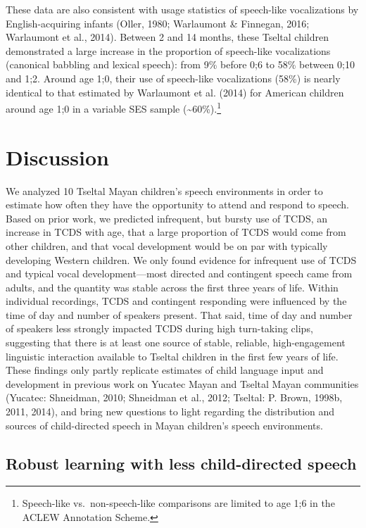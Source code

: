 \documentclass[floatsintext,man]{apa6}
\theoremstyle{definition}
\theoremstyle{definition}
\theoremstyle{definition}
\theoremstyle{remark}
\begin{document}
These data are also consistent with usage statistics of speech-like
vocalizations by English-acquiring infants (Oller, 1980; Warlaumont \&
Finnegan, 2016; Warlaumont et al., 2014). Between 2 and 14 months, these
Tseltal children demonstrated a large increase in the proportion of
speech-like vocalizations (canonical babbling and lexical speech): from
9\% before 0;6 to 58\% between 0;10 and 1;2. Around age 1;0, their use
of speech-like vocalizations (58\%) is nearly identical to that
estimated by Warlaumont et al. (2014) for American children around age
1;0 in a variable SES sample (\textasciitilde{}60\%).\footnote{Speech-like
  vs.~non-speech-like comparisons are limited to age 1;6 in the ACLEW
  Annotation Scheme.}

\section{Discussion}\label{disc}

We analyzed 10 Tseltal Mayan children's speech environments in order to
estimate how often they have the opportunity to attend and respond to
speech. Based on prior work, we predicted infrequent, but bursty use of
TCDS, an increase in TCDS with age, that a large proportion of TCDS
would come from other children, and that vocal development would be on
par with typically developing Western children. We only found evidence
for infrequent use of TCDS and typical vocal development---most directed
and contingent speech came from adults, and the quantity was stable
across the first three years of life. Within individual recordings, TCDS
and contingent responding were influenced by the time of day and number
of speakers present. That said, time of day and number of speakers less
strongly impacted TCDS during high turn-taking clips, suggesting that
there is at least one source of stable, reliable, high-engagement
linguistic interaction available to Tseltal children in the first few
years of life. These findings only partly replicate estimates of child
language input and development in previous work on Yucatec Mayan and
Tseltal Mayan communities (Yucatec: Shneidman, 2010; Shneidman et al.,
2012; Tseltal: P. Brown, 1998b, 2011, 2014), and bring new questions to
light regarding the distribution and sources of child-directed speech in
Mayan children's speech environments.

\subsection{Robust learning with less child-directed
speech}\label{robust-learning-with-less-child-directed-speech}
\end{document}
